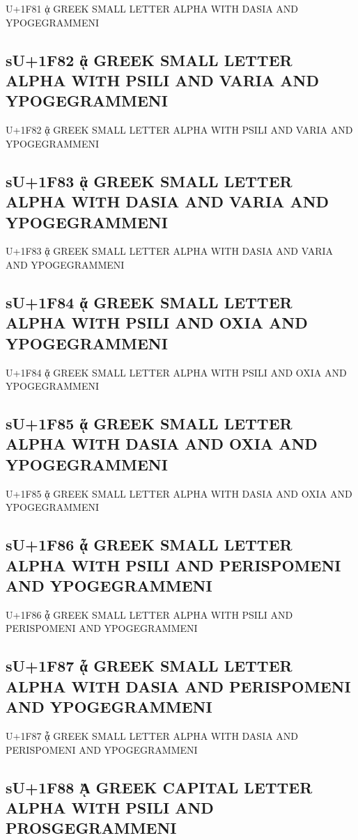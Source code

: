 U+1F81 ᾁ GREEK SMALL LETTER ALPHA WITH DASIA AND YPOGEGRAMMENI

\subsection{sU+1F82 ᾂ GREEK SMALL LETTER ALPHA WITH PSILI AND VARIA AND YPOGEGRAMMENI}

U+1F82 ᾂ GREEK SMALL LETTER ALPHA WITH PSILI AND VARIA AND YPOGEGRAMMENI

\subsection{sU+1F83 ᾃ GREEK SMALL LETTER ALPHA WITH DASIA AND VARIA AND YPOGEGRAMMENI}

U+1F83 ᾃ GREEK SMALL LETTER ALPHA WITH DASIA AND VARIA AND YPOGEGRAMMENI

\subsection{sU+1F84 ᾄ GREEK SMALL LETTER ALPHA WITH PSILI AND OXIA AND YPOGEGRAMMENI}

U+1F84 ᾄ GREEK SMALL LETTER ALPHA WITH PSILI AND OXIA AND YPOGEGRAMMENI

\subsection{sU+1F85 ᾅ GREEK SMALL LETTER ALPHA WITH DASIA AND OXIA AND YPOGEGRAMMENI}

U+1F85 ᾅ GREEK SMALL LETTER ALPHA WITH DASIA AND OXIA AND YPOGEGRAMMENI

\subsection{sU+1F86 ᾆ GREEK SMALL LETTER ALPHA WITH PSILI AND PERISPOMENI AND YPOGEGRAMMENI}

U+1F86 ᾆ GREEK SMALL LETTER ALPHA WITH PSILI AND PERISPOMENI AND YPOGEGRAMMENI

\subsection{sU+1F87 ᾇ GREEK SMALL LETTER ALPHA WITH DASIA AND PERISPOMENI AND YPOGEGRAMMENI}

U+1F87 ᾇ GREEK SMALL LETTER ALPHA WITH DASIA AND PERISPOMENI AND YPOGEGRAMMENI

\subsection{sU+1F88 ᾈ GREEK CAPITAL LETTER ALPHA WITH PSILI AND PROSGEGRAMMENI}

